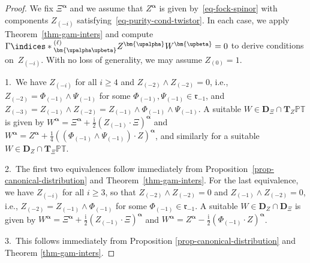 \documentclass[pdftex]{sigma}
\numberwithin{equation}{section}
\newcommand{\mbf} [1]{\mathbf{#1}}
\newcommand{\ii} {\mathrm{i}}
\newcommand{\ind} {\indices}
\newcommand{\mfr} {\mathfrak{r}}
\newcommand{\PT} {\mathbb{PT}}
\begin{document}
\begin{proof} We f\/ix $\Xi^{\bm{\upalpha}}$ and we assume that $Z^{\bm{\upalpha}}$ is given by~\eqref{eq-fock-spinor} with components $Z_{(-i)}$ satis\-fying~\eqref{eq-purity-cond-twistor}. In each case, we apply Theorem~\ref{thm-gam-inters} and compute $\Gamma \ind*{^{(\ell)}_{\bm{\upalpha \upbeta}}} Z^{\bm{\upalpha}} W^{\bm{\upbeta}} = 0$ to derive conditions on~$Z_{(-i)}$. With no loss of generality, we may assume $Z_{(0)} = 1$.

1.~We have $Z_{(-i)}$ for all $i\geq4$ and $Z_{(-2)} \wedge Z_{(-2)} = 0$, i.e., $Z_{(-2)} = \Phi_{(-1)} \wedge \Psi_{(-1)}$ for some $\Phi_{(-1)} , \Psi_{(-1)} \in \mfr_{-1}$, and $Z_{(-3)} = Z_{(-1)} \wedge Z_{(-2)} = Z_{(-1)} \wedge \Phi_{(-1)} \wedge \Psi_{(-1)}$. A suitable $W \in \mbf{D}_\Xi \cap \mbf{T}_Z \PT$ is given by $W^{\bm{\upalpha}} = \Xi^{\bm{\upalpha}} + \frac{\ii}{2} ( Z_{(-1)} \cdot \Xi)^{\bm{\upalpha}}$ and $W^{\bm{\upalpha}} = Z^{\bm{\upalpha}} + \frac{1}{4} (( \Phi_{(-1)} \wedge \Psi_{(-1)} ) \cdot Z)^{\bm{\upalpha}}$, and similarly for a suitable $W \in \mbf{D}_Z \cap \mbf{T}_\Xi \PT$.

2.~The f\/irst two equivalences follow immediately from Proposition~\ref{prop-canonical-distribution} and Theorem~\ref{thm-gam-inters}. For the last equivalence, we have $Z_{(-i)}$ for all $i\geq3$, so that $Z_{(-2)} \wedge Z_{(-2)} = 0$ and $Z_{(-1)} \wedge Z_{(-2)} = 0$, i.e., $Z_{(-2)} = Z_{(-1)} \wedge \Phi_{(-1)}$ for some $\Phi_{(-1)} \in \mfr_{-1}$. A suitable $W \in \mbf{D}_Z \cap \mbf{D}_\Xi$ is given by $W^{\bm{\upalpha}} = \Xi^{\bm{\upalpha}} + \frac{\ii}{2} ( Z_{(-1)} \cdot \Xi )^{\bm{\upalpha}}$ and $W^{\bm{\upalpha}} = Z^{\bm{\upalpha}} - \frac{\ii}{2} ( \Phi_{(-1)} \cdot Z )^{\bm{\upalpha}}$.

3.~This follows immediately from Proposition \ref{prop-canonical-distribution} and Theorem \ref{thm-gam-inters}.
\end{proof}
\end{document}
